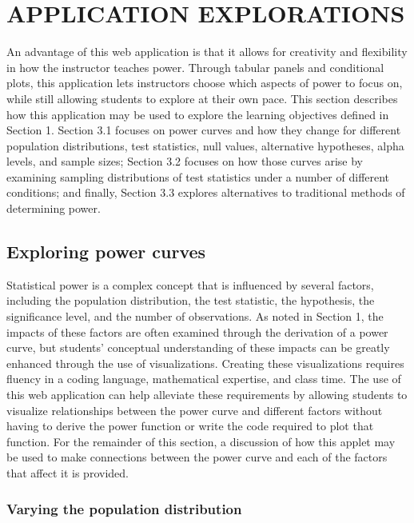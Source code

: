 \documentclass{TISE}
\begin{document}
\section{APPLICATION EXPLORATIONS}

An advantage of this web application is that it allows for creativity and flexibility in how the instructor teaches power. Through tabular panels and conditional plots, this application lets instructors choose which aspects of power to focus on, while still allowing students to explore at their own pace. This section describes how this application may be used to explore the learning objectives defined in Section 1. Section 3.1 focuses on power curves and how they change for different population distributions, test statistics, null values, alternative hypotheses, alpha levels, and sample sizes; Section 3.2 focuses on how those curves arise by examining sampling distributions of test statistics under a number of different conditions; and finally, Section 3.3 explores alternatives to traditional methods of determining power.

\subsection{Exploring power curves}

Statistical power is a complex concept that is influenced by several factors, including the population distribution, the test statistic, the hypothesis, the significance level, and the number of observations. As noted in Section 1, the impacts of these factors are often examined through the derivation of a power curve, but students' conceptual understanding of these impacts can be greatly enhanced through the use of visualizations. Creating these visualizations requires fluency in a coding language, mathematical expertise, and class time. The use of this web application can help alleviate these requirements by allowing students to visualize relationships between the power curve and different factors without having to derive the power function or write the code required to plot that function. For the remainder of this section, a discussion of how this applet may be used to make connections between the power curve and each of the factors that affect it is provided.

\subsubsection{Varying the population distribution}
\end{document}
